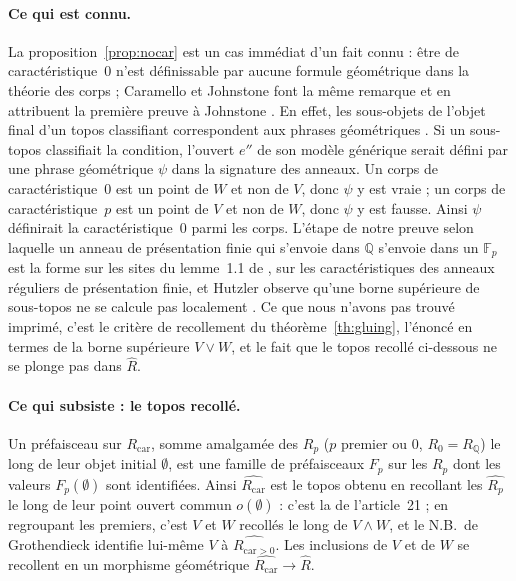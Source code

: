 \paragraph{Ce qui est connu.} La proposition~\ref{prop:nocar} est un cas immédiat d'un fait connu : être de caractéristique~$0$ n'est définissable par aucune formule géométrique dans la théorie des corps \cite[\S8.2]{caramello-flat} ; Caramello et Johnstone font la même remarque et en attribuent la première preuve à Johnstone \cite{caramello-johnstone}. En effet, les sous-objets de l'objet final d'un topos classifiant correspondent aux phrases géométriques \cite[\S7.1]{caramello-lattices}. Si un sous-topos classifiait la condition, l'ouvert $e''$ de son modèle générique serait défini par une phrase géométrique $\psi$ dans la signature des anneaux. Un corps de caractéristique~$0$ est un point de $W$ et non de $V$, donc $\psi$ y est vraie ; un corps de caractéristique~$p$ est un point de $V$ et non de $W$, donc $\psi$ y est fausse. Ainsi $\psi$ définirait la caractéristique~$0$ parmi les corps. L'étape de notre preuve selon laquelle un anneau de présentation finie qui s'envoie dans $\mathbb Q$ s'envoie dans un $\mathbb F_p$ est la forme sur les sites du lemme~1.1 de \cite{caramello-johnstone}, sur les caractéristiques des anneaux réguliers de présentation finie, et Hutzler observe qu'une borne supérieure de sous-topos ne se calcule pas localement \cite[rem.~3.5.2]{hutzler}. Ce que nous n'avons pas trouvé imprimé, c'est le critère de recollement du théorème~\ref{th:gluing}, l'énoncé en termes de la borne supérieure $V\vee W$, et le fait que le topos recollé ci-dessous ne se plonge pas dans $\widehat R$.

\paragraph{Ce qui subsiste : le topos recollé.} Un préfaisceau sur $R_{\mathrm{car}}$, somme amalgamée des $R_p$ ($p$ premier ou $0$, $R_0 = R_{\mathbb Q}$) le long de leur objet initial $\emptyset$, est une famille de préfaisceaux $F_p$ sur les $R_p$ dont les valeurs $F_p(\emptyset)$ sont identifiées. Ainsi $\widehat{R_{\mathrm{car}}}$ est le topos obtenu en recollant les $\widehat{R_p}$ le long de leur point ouvert commun $o(\emptyset)$ : c'est la  de l'article~21 ; en regroupant les premiers, c'est $V$ et $W$ recollés le long de $V\wedge W$, et le N.B.\ de Grothendieck identifie lui-même $V$ à $\widehat{R_{\mathrm{car}>0}}$. Les inclusions de $V$ et de $W$ se recollent en un morphisme géométrique $\widehat{R_{\mathrm{car}}}\to\widehat R$.

